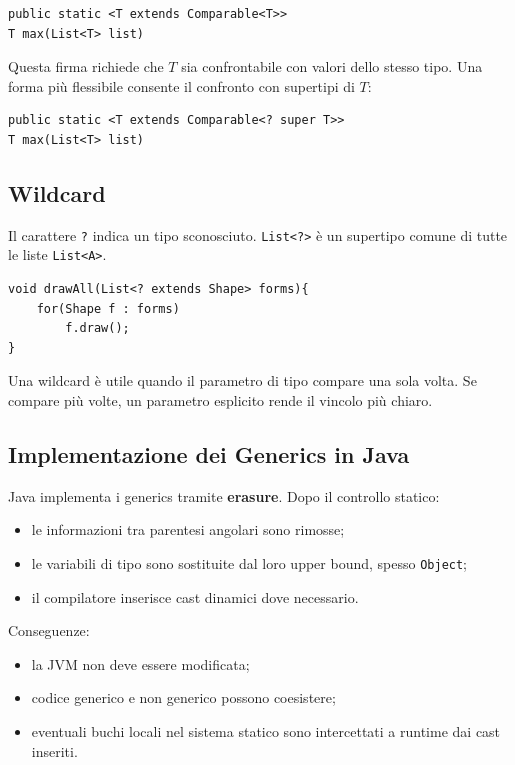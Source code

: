 \documentclass{article}
\begin{document}
\begin{lstlisting}
public static <T extends Comparable<T>>
T max(List<T> list)
\end{lstlisting}

Questa firma richiede che $T$ sia confrontabile con valori dello stesso tipo. Una forma più flessibile consente il confronto con supertipi di $T$:

\begin{lstlisting}
public static <T extends Comparable<? super T>>
T max(List<T> list)
\end{lstlisting}

\subsection{Wildcard}

Il carattere \texttt{?} indica un tipo sconosciuto. \texttt{List<?>} è un supertipo comune di tutte le liste \texttt{List<A>}.

\begin{lstlisting}
void drawAll(List<? extends Shape> forms){
    for(Shape f : forms)
        f.draw();
}
\end{lstlisting}

Una wildcard è utile quando il parametro di tipo compare una sola volta. Se compare più volte, un parametro esplicito rende il vincolo più chiaro.

\subsection{Implementazione dei Generics in Java}

Java implementa i generics tramite \textbf{erasure}. Dopo il controllo statico:
\begin{itemize}
  \item le informazioni tra parentesi angolari sono rimosse;
  \item le variabili di tipo sono sostituite dal loro upper bound, spesso \texttt{Object};
  \item il compilatore inserisce cast dinamici dove necessario.
\end{itemize}

Conseguenze:
\begin{itemize}
  \item la JVM non deve essere modificata;
  \item codice generico e non generico possono coesistere;
  \item eventuali buchi locali nel sistema statico sono intercettati a runtime dai cast inseriti.
\end{itemize}
\end{document}
